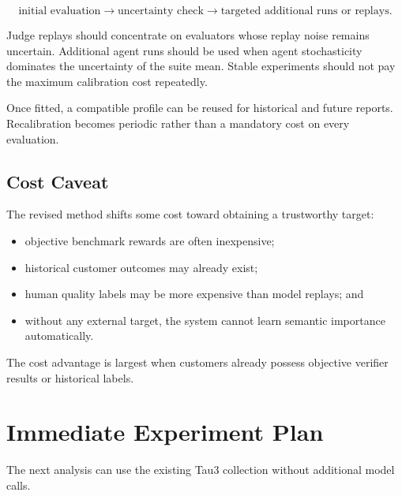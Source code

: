 \documentclass[11pt]{article}
\begin{document}
\begin{center}
\[
\text{initial evaluation}
\longrightarrow
\text{uncertainty check}
\longrightarrow
\text{targeted additional runs or replays}.
\]
\end{center}

Judge replays should concentrate on evaluators whose replay noise remains
uncertain. Additional agent runs should be used when agent stochasticity
dominates the uncertainty of the suite mean. Stable experiments should not
pay the maximum calibration cost repeatedly.

Once fitted, a compatible profile can be reused for historical and future
reports. Recalibration becomes periodic rather than a mandatory cost on every
evaluation.

\subsection{Cost Caveat}

The revised method shifts some cost toward obtaining a trustworthy target:

\begin{itemize}
    \item objective benchmark rewards are often inexpensive;
    \item historical customer outcomes may already exist;
    \item human quality labels may be more expensive than model replays; and
    \item without any external target, the system cannot learn semantic
    importance automatically.
\end{itemize}

The cost advantage is largest when customers already possess objective
verifier results or historical labels.

\section{Immediate Experiment Plan}

The next analysis can use the existing Tau3 collection without additional
model calls.
\end{document}
